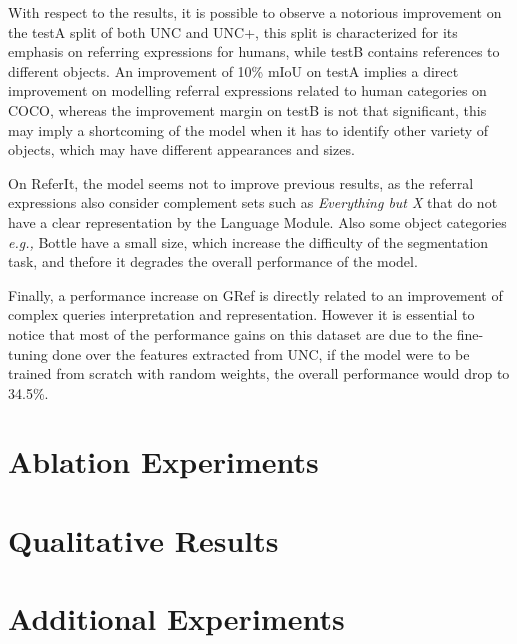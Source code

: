 With respect to the results, it is possible to observe a notorious improvement on the testA split of both UNC and UNC+, this split is characterized for its emphasis on referring expressions for humans, while testB contains references to different objects. An improvement of 10\% mIoU on testA implies a direct improvement on modelling referral expressions related to human categories on COCO, whereas the improvement margin on testB is not that significant, this may imply a shortcoming of the model when it has to identify other variety of objects, which may have different appearances and sizes.

On ReferIt, the model seems not to improve previous results, as the referral expressions also consider complement sets such as \textit{Everything but X} that do not have a clear representation by the Language Module. Also some object categories \textit{e.g.,} Bottle have a small size, which increase the difficulty of the segmentation task, and thefore it degrades the overall performance of the model.

Finally, a performance increase on GRef is directly related to an improvement of complex queries interpretation and representation. However it is essential to notice that most of the performance gains on this dataset are due to the fine-tuning done over the features extracted from UNC, if the model were to be trained from scratch with random weights, the overall performance would drop to 34.5\%.

\section{Ablation Experiments}
\label{section:ablation}

\section{Qualitative Results}

\section{Additional Experiments}